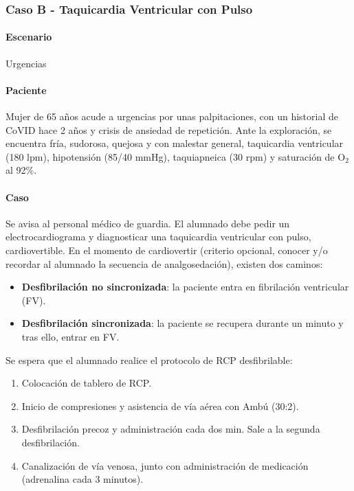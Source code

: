 \subsubsection{Caso B - Taquicardia Ventricular con Pulso}
\paragraph{Escenario} Urgencias
\vspace{-12.5pt}
\paragraph{Paciente} Mujer de 65 años acude a urgencias por unas palpitaciones, con un historial de CoVID hace 2 años y crisis de ansiedad de repetición. Ante la exploración, se encuentra fría, sudorosa, quejosa y con malestar general, taquicardia ventricular (180 lpm), hipotensión (85/40 mmHg), taquiapneica (30 rpm) y saturación de O$_2$ al 92\%.
\vspace{-12.5pt}
\paragraph{Caso} Se avisa al personal médico de guardia. El alumnado debe pedir un electrocardiograma y diagnosticar una taquicardia ventricular con pulso, cardiovertible. En el momento de cardiovertir (criterio opcional, conocer y/o recordar al alumnado la secuencia de analgosedación), existen dos caminos:
    \begin{itemize}[topsep=0pt, partopsep=0pt,itemsep=0pt,parsep=0pt]
        \item \textbf{Desfibrilación no sincronizada}: la paciente entra en fibrilación ventricular (FV).
        \item \textbf{Desfibrilación sincronizada}: la paciente se recupera durante un minuto y tras ello, entrar en FV.
    \end{itemize}
Se espera que el alumnado realice el protocolo de RCP desfibrilable:
\begin{enumerate}[topsep=0pt, partopsep=0pt,itemsep=0pt,parsep=0pt]
    \item Colocación de tablero de RCP.
    \item Inicio de compresiones y asistencia de vía aérea con Ambú (30:2).
    \item Desfibrilación precoz y administración cada dos min. Sale a la segunda desfibrilación.
    \item Canalización de vía venosa, junto con administración de medicación (adrenalina cada 3 minutos).
\end{enumerate}
\vspace{-12.5pt}
